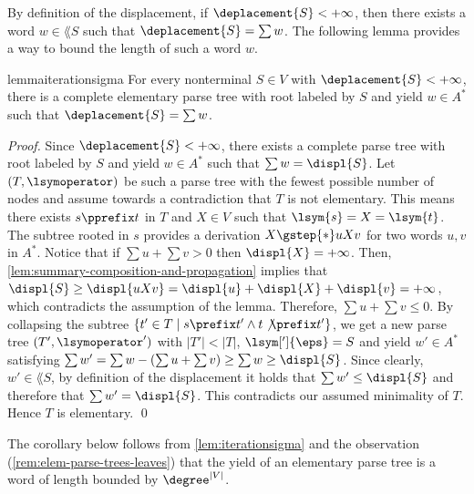 By definition of the displacement,
if $\deplacement{S}<+\infty$,
then there exists a word $w\in\lang{S}$
such that $\deplacement{S}=\sum w$.
The following lemma provides a way to bound the length of such a word $w$.

\begin{restatable}{lemma}{iterationsigma}
  \label{lem:iterationsigma}
  For every nonterminal $S\in V$ with $\deplacement{S}<+\infty$,
  there is a complete
  elementary parse tree with root labeled by $S$ and
  yield $w\in A^*$ such that $\deplacement{S}=\sum w$.
\end{restatable}
\begin{proof}
  Since $\deplacement{S}<+\infty$,
  there exists a complete parse tree with root labeled by $S$ and yield
  $w\in A^*$ such that $\sum w= \displ{S}$.
  Let $(T,\lsymoperator)$ be such a parse tree with the fewest possible number
  of nodes and assume towards a contradiction that $T$ is not elementary. 
  This means there exists $s\pprefix t$ in $T$ and $X\in V$ such
  that $\lsym{s}=X=\lsym{t}$.
  The subtree rooted in $s$ provides a derivation $X\gstep{*}uXv$
  for two words $u,v$ in $A^*$.
Notice that if $\sum u+\sum v>0$ then
  $\displ{X}=+\infty$.
  Then, \cref{lem:summary-composition-and-propagation} implies that
  $\displ{S}\ge \displ{uXv}= \displ{u} +\displ{X} +\displ{v} =+\infty$,
  which contradicts the assumption of the lemma. Therefore, $\sum u+\sum v\leq 0$. 
  By collapsing the subtree
  $\{t'\in T \mid s\prefix t' \wedge  t\not\prefix t'\}$,
  we get a new parse
  tree $(T',\lsymoperator')$ with $|T'|<|T|$, $\lsym[']{\eps}=S$ and
  yield $w'\in A^*$ satisfying
  $\sum w'= \sum w -(\sum u+\sum v)\geq \sum w \geq \displ{S}$.
  Since clearly, $w'\in\lang{S}$, by definition of the displacement
  it holds that $\sum w'\le \displ{S}$ and therefore that $\sum w'=\displ{S}$.
  This contradicts our assumed minimality of $T$.
  Hence $T$ is elementary.
  \qed
\end{proof}

The corollary below follows from \cref{lem:iterationsigma}
and the observation (\cref{rem:elem-parse-trees-leaves})
that the yield of an elementary parse tree is a word of length bounded by
$\degree^{|V|}$.

